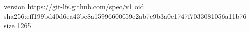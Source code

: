 version https://git-lfs.github.com/spec/v1
oid sha256:eff199bd40d6ea43be8a15996600059e2ab7e9b3a0e1747f7033081056a11b76
size 1265
